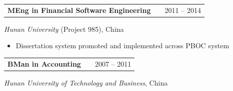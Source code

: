 \begin{tabularx}{\linewidth}{@{}l X r@{}}
\textbf{MEng in Financial Software Engineering} & & 2011 -- 2014 \\
\end{tabularx}
\textit{Hunan University} (Project 985), China
\begin{itemize}[nosep, leftmargin=1em, itemsep=2pt, label=--]
    \item Dissertation system promoted and implemented across PBOC system
\end{itemize}

\vspace{4pt}

\begin{tabularx}{\linewidth}{@{}l X r@{}}
\textbf{BMan in Accounting} & & 2007 -- 2011 \\
\end{tabularx}
\textit{Hunan University of Technology and Business}, China
